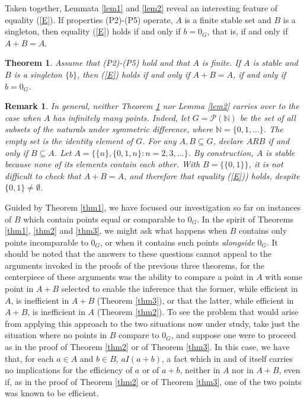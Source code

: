 \documentclass[pdflatex,sn-apa,11pt]{sn-jnl}%
\newtheorem{theorem}{Theorem}%
\newtheorem{remark}{Remark}%
\begin{document}
Taken together, Lemmata \ref{lem1} and \ref{lem2} reveal an interesting feature of equality (\ref{E}). If properties (P2)-(P5) operate, $A$ is a finite stable set and $B$ is a singleton, then equality (\ref{E}) holds if and only if $b = 0_G$, that is, if and only if $A+B=A$.

\begin{theorem}
\label{cor1}
Assume that (P2)-(P5) hold and that $A$ is finite. If $A$ is stable and $B$ is a singleton $\{b\}$, then (\ref{E}) holds if and only if $A+B=A$, if and only if $b = 0_G$. 
\end{theorem}

\begin{remark}
\label{rem_cor1}
In general, neither Theorem \ref{cor1} nor Lemma \ref{lem2} carries over to the case when $A$ has infinitely many points. Indeed, let $G = \mathscr{P}(\mathbb{N})$ be the set of all subsets of the naturals under symmetric difference, where $\mathbb{N} = \{0, 1, ...\}$. The empty set is the identity element of $G$. For any $A, B \subseteq G$, declare $ARB$ if and only if $B \subseteq A$. Let $A = \{\{n\}, \{0, 1, n\}: n = 2, 3,...\}$. By construction, $A$ is stable because none of its elements contain each other. With $B = \{\{0, 1\}\}$, it is not difficult to check that $A+B=A$, and therefore that equality (\ref{E})) holds, despite $\{0, 1\} \neq \emptyset$.   

\end{remark}

Guided by Theorem \ref{thm1}, we have focused our investigation so far on instances of $B$ which contain points equal or comparable to $0_G$. In the spirit of Theorems \ref{thm1}, \ref{thm2} and \ref{thm3}, we might ask what happens when $B$ contains only points incomparable to $0_G$, or when it contains such points \textit{alongside} $0_G$. It should be noted that the answers to these questions cannot appeal to the arguments invoked in the proofs of the previous three theorems, for the centerpiece of these arguments was the ability to compare a point in $A$ with some point in $A+B$ selected to enable the inference that the former, while efficient in $A$, is inefficient in $A+B$ (Theorem \ref{thm3}), or that the latter, while efficient in $A+B$, is inefficient in $A$ (Theorem \ref{thm2}). To see the problem that would arise from applying this approach to the two situations now under study, take just the situation where no points in $B$ compare to $0_{G}$, and suppose one were to proceed as in the proof of Theorem \ref{thm2} or of Theorem \ref{thm3}. In this case, we have that, for each $a \in A$ and $b \in B$, $aI(a+b)$, a fact which in and of itself carries no implications for the efficiency of $a$ or of $a+b$, neither in $A$ nor in $A+B$, even if, as in the proof of Theorem \ref{thm2} or of Theorem \ref{thm3}, one of the two points was known to be efficient.  
\end{document}
